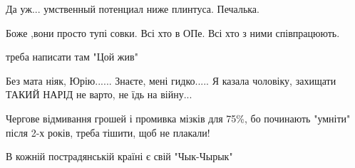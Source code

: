 \begin{itemize}
 
Да уж... умственный потенциал ниже плинтуса. Печалька.

 
Боже ,вони просто тупі совки. Всі хто в ОПе. Всі хто з ними співпрацюють.

 
треба написати там "Цой жив"

 
Без мата ніяк, Юрію......
Знаєте, мені гидко.....
Я казала чоловіку, захищати ТАКИЙ НАРІД не варто, не їдь на війну...

 
Чергове відмивання грошей і промивка мізків для 75\%, бо починають "умніти" після 2-х років, треба тішити, щоб не плакали!

 
В кожній пострадянській країні є свій "Чык-Чырык"

 

\end{itemize}
